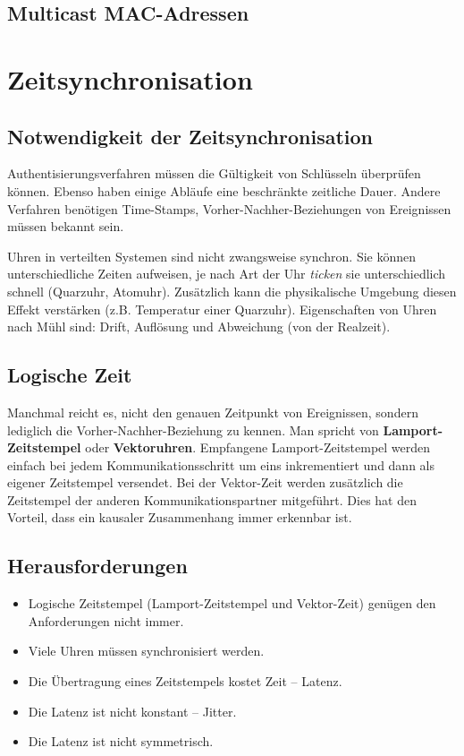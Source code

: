 \documentclass{article} %
\begin{document}
\subsection{Multicast MAC-Adressen}

\section{Zeitsynchronisation}

\subsection{Notwendigkeit der Zeitsynchronisation}
Authentisierungsverfahren müssen die Gültigkeit von Schlüsseln überprüfen können.
Ebenso haben einige Abläufe eine beschränkte zeitliche Dauer.
Andere Verfahren benötigen Time-Stamps, Vorher-Nachher-Beziehungen von Ereignissen müssen bekannt sein.

Uhren in verteilten Systemen sind nicht zwangsweise synchron.
Sie können unterschiedliche Zeiten aufweisen, je nach Art der Uhr \emph{ticken} sie unterschiedlich schnell (Quarzuhr, Atomuhr).
Zusätzlich kann die physikalische Umgebung diesen Effekt verstärken (z.B. Temperatur einer Quarzuhr).
Eigenschaften von Uhren nach Mühl sind: Drift, Auflösung und Abweichung (von der Realzeit).

\subsection{Logische Zeit}
Manchmal reicht es, nicht den genauen Zeitpunkt von Ereignissen, sondern lediglich die Vorher-Nachher-Beziehung zu kennen.
Man spricht von \textbf{Lamport-Zeitstempel} oder \textbf{Vektoruhren}.
Empfangene Lamport-Zeitstempel werden einfach bei jedem Kommunikationsschritt um eins inkrementiert und dann als eigener Zeitstempel versendet.
Bei der Vektor-Zeit werden zusätzlich die Zeitstempel der anderen Kommunikationspartner mitgeführt.
Dies hat den Vorteil, dass ein kausaler Zusammenhang immer erkennbar ist.

\subsection{Herausforderungen}
\begin{itemize}
	\item Logische Zeitstempel (Lamport-Zeitstempel und Vektor-Zeit) genügen den Anforderungen nicht immer.
	\item Viele Uhren müssen synchronisiert werden.
	\item Die Übertragung eines Zeitstempels kostet Zeit – Latenz.
	\item Die Latenz ist nicht konstant – Jitter.
	\item Die Latenz ist nicht symmetrisch.
\end{itemize}
\end{document}
